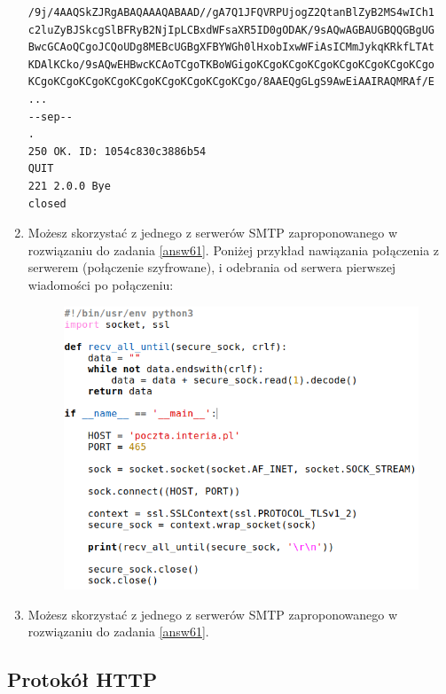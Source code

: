 \begin{enumerate}[label=\textbf{6.\arabic*}]
\begin{verbatim}
/9j/4AAQSkZJRgABAQAAAQABAAD//gA7Q1JFQVRPUjogZ2QtanBlZyB2MS4wICh1
c2luZyBJSkcgSlBFRyB2NjIpLCBxdWFsaXR5ID0gODAK/9sAQwAGBAUGBQQGBgUG
BwcGCAoQCgoJCQoUDg8MEBcUGBgXFBYWGh0lHxobIxwWFiAsICMmJykqKRkfLTAt
KDAlKCko/9sAQwEHBwcKCAoTCgoTKBoWGigoKCgoKCgoKCgoKCgoKCgoKCgoKCgo
KCgoKCgoKCgoKCgoKCgoKCgoKCgoKCgoKCgo/8AAEQgGLgS9AwEiAAIRAQMRAf/E
...
--sep--
.
250 OK. ID: 1054c830c3886b54
QUIT
221 2.0.0 Bye
closed
\end{verbatim}
\normalsize

\newpage 
\item Możesz skorzystać z jednego z serwerów SMTP zaproponowanego w rozwiązaniu do zadania \ref{answ61}. Poniżej przykład nawiązania połączenia z serwerem (połączenie szyfrowane), i odebrania od serwera pierwszej wiadomości po połączeniu: \\  

\begin{figure}[h]
\centering
\includegraphics[scale=0.45]{./images/answers/smtp-py.png}
\end{figure}  

\item Możesz skorzystać z jednego z serwerów SMTP zaproponowanego w rozwiązaniu do zadania \ref{answ61}. 

\end{enumerate}

\newpage
\subsection*{Protokół HTTP}

